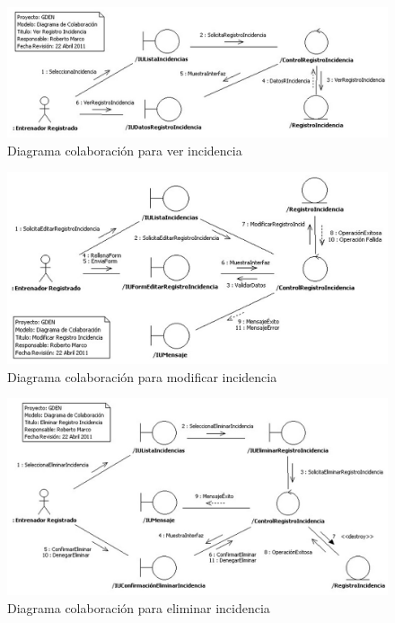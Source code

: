			\begin{figure}[H]
			  \centering
			    \includegraphics[width=16cm]{./eps/colaboraciones/gestion_diarioincidencia/VerRegistroIncidencia.eps}
			  \caption{Diagrama colaboración para ver incidencia}
			  \label{fig:col_ver_incidencia}
			\end{figure}
			
			\begin{figure}[H]
			  \centering
			    \includegraphics[width=16cm]{./eps/colaboraciones/gestion_diarioincidencia/ModificarRegistroIncidencia.eps}
			  \caption{Diagrama colaboración para modificar incidencia}
			  \label{fig:col_modificar_incidencia}
			\end{figure}
			
			\begin{figure}[H]
			  \centering
			    \includegraphics[width=16cm]{./eps/colaboraciones/gestion_diarioincidencia/EliminarRegistroIncidencia.eps}
			  \caption{Diagrama colaboración para eliminar incidencia}
			  \label{fig:col_eliminar_incidencia}
			\end{figure}
		
